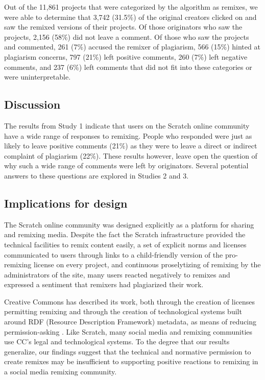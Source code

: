 Out of the 11,861 projects that were categorized by the algorithm as remixes,
we were able to determine that 3,742 (31.5\%) of the original creators
clicked on and saw the remixed versions of their projects. Of
those originators who saw the projects, 2,156 (58\%) did not leave a
comment.  Of those who saw the projects and commented, 261 (7\%) accused
the remixer of plagiarism, 566 (15\%) hinted at plagiarism concerns, 797
(21\%) left positive comments, 260 (7\%) left negative comments, and 237
(6\%) left comments that did not fit into these categories or were
uninterpretable.

\subsection{Discussion}

The results from Study 1 indicate that users on the Scratch online
community have a wide range of responses to remixing. People who responded were just
as likely to leave positive comments (21\%) as they were to leave a
direct or indirect complaint of plagiarism (22\%). These results
however, leave open the question of why such a wide range of comments
were left by originators. Several potential answers to these questions
are explored in Studies 2 and 3.

\subsection{Implications for design}

The Scratch online community was designed explicitly as a platform for
sharing and remixing media. Despite the fact the Scratch
infrastructure provided the technical facilities to remix content
easily, a set of explicit norms and licenses communicated to
users through links to a child-friendly version of the
pro-remixing license on every project, and continuous proselytizing of
remixing by the administrators of the site, many users reacted
negatively to remixes and expressed a sentiment that remixers had
plagiarized their work.

Creative Commons has described its work, both through the creation of
licenses permitting remixing and through the creation of technological
systems built around RDF (Resource Description Framework) metadata, as
means of reducing permission-asking \cite{lessig_keynote_2004}. Like
Scratch, many social media and remixing communities use CC's legal and
technological systems.  To the degree that our results generalize, our
findings suggest that the technical and normative permission to create
remixes may be insufficient to supporting positive reactions to remixing
in a social media remixing community.

